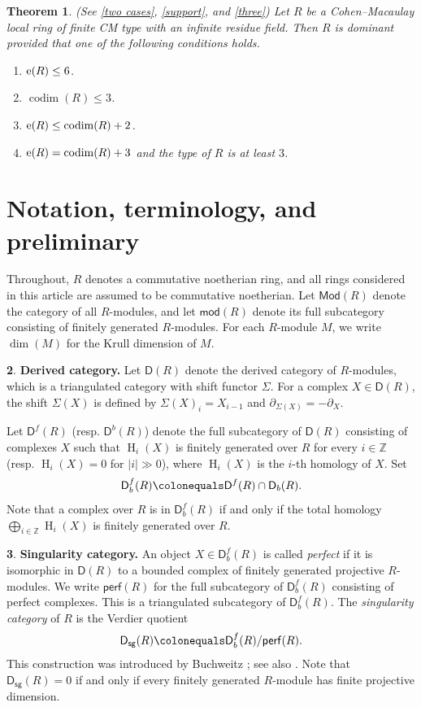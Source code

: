 \documentclass{amsart}
\DeclareMathOperator{\h}{H}
\newcommand{\Z}{\mathbb{Z}}
\newcommand{\D}{\mathsf{D}}
\newcommand{\del}{\partial}
\newcommand{\0}{{\bf{0}}}
\DeclareMathOperator{\codim}{codim}
\newcommand{\per}{\mathsf{perf}}
\newcommand{\sg}{\mathsf{sg}}
\newcommand{\Mod}{\mathsf{Mod}}
\newcommand{\mo}{\mathsf{mod}}
\newtheorem{theorem}{Theorem}[section]
\theoremstyle{definition}
\newtheorem{chunk}[theorem]{}
\begin{document}
\begin{theorem}\label{T2}
 (See \ref{two cases}, \ref{support}, and \ref{three}) Let $R$ be a Cohen--Macaulay local ring of finite CM type with an infinite residue field. Then $R$ is dominant provided that one of the following conditions holds.
\begin{enumerate}
    \item ${\rm e}(R)\leq 6$.
    \item $\codim(R)\leq 3$.
    \item ${\rm e}(R)\leq \codim(R)+2$.
    \item ${\rm e}(R)=\codim(R)+3$ and the type of $R$ is at least $3$.
\end{enumerate}
\end{theorem}




\section{Notation, terminology, and preliminary}
Throughout, $R$ denotes a commutative noetherian ring, and all rings considered in this article are assumed to be commutative noetherian. Let $\Mod(R)$ denote the category of all $R$-modules, and let $\mo(R)$ denote its full subcategory consisting of finitely generated $R$-modules. For each $R$-module $M$, we write $\dim(M)$ for the Krull dimension of $M$.
\begin{chunk}
\textbf{Derived category.}
Let $\D(R)$ denote the derived category of $R$-modules, which is a triangulated category with shift functor $\Sigma$. For a complex $X\in \D(R)$, the shift $\Sigma(X)$ is defined by $\Sigma(X)_i=X_{i-1}$ and $\del_{\Sigma(X)}=-\del_X$.

Let $\D^f(R)$ (resp. $\D^b(R)$) denote the full subcategory of $\D(R)$ consisting of complexes $X$ such that $\h_i(X)$ is finitely generated over $R$ for every $i\in\mathbb Z$ (resp. $\h_i(X)=0$ for $|i|\gg0$), where $\h_i(X)$ is the $i$-th homology of $X$. Set $$\D^f_b(R)\colonequals \D^f(R)\cap\D_b(R).$$  Note that a complex over $R$ is in $\D^f_b(R)$ if and only if the total homology $\bigoplus_{i\in\Z}\h_i(X)$ is finitely generated over $R$. 
\end{chunk}
\begin{chunk}
\textbf{Singularity category.}
An object $X\in\D^f_b(R)$ is called \emph{perfect} if it is isomorphic in $\D(R)$ to a bounded complex of finitely generated projective $R$-modules. We write $\per(R)$ for the full subcategory of $\D^f_b(R)$ consisting of perfect complexes. This is a triangulated subcategory of $\D^f_b(R)$. The \emph{singularity category} of $R$ is the Verdier quotient
\[
\D_{\sg}(R)\colonequals \D^f_b(R)/\per(R).
\]
This construction was introduced by Buchweitz \cite[Definition 1.2.2]{Buchweitz}; see also \cite{Orlov}.
Note that $\D_{\sg}(R)=0$ if and only if every finitely generated $R$-module has finite projective dimension. 
\end{chunk}
\end{document}
